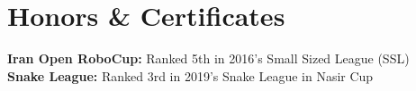 
\section{Honors \& Certificates}
  \vspace{2pt}
  \resumeSubHeadingListStart
    \small{\item{
        \textbf{Iran Open RoboCup:} { Ranked 5th in 2016's Small Sized League (SSL)}
        \\ \vspace{3pt}
        \textbf{Snake League:} { Ranked 3rd in 2019's Snake League in Nasir Cup}
    }}
  \resumeSubHeadingListEnd